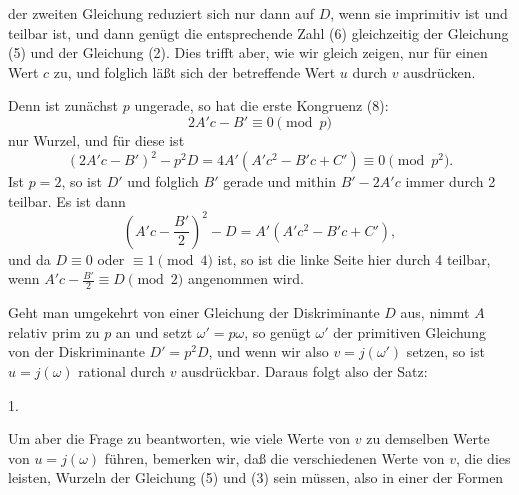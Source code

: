 der zweiten Gleichung reduziert sich nur dann auf $D$, wenn sie imprimitiv ist und
teilbar ist, und dann genügt die entsprechende Zahl (6) gleichzeitig der Gleichung (5) und der Gleichung (2). Dies trifft aber, wie wir gleich zeigen, nur für einen Wert $c$ zu, und folglich läßt sich der betreffende Wert $u$  durch $v$ ausdrücken.

Denn ist zunächst $p$ ungerade, so hat die erste Kongruenz (8):
\[
2A'c - B' \equiv 0 \pmod{p}
\]
nur  Wurzel, und für diese ist
\[
(2A'c - B')^2 - p^2D = 4A'(A'c^2 - B'c + C') \equiv 0 \pmod{p^2}.
\]
Ist $p = 2$, so ist $D'$ und folglich $B'$ gerade und mithin $B' - 2A'c$ immer durch 2 teilbar. Es ist dann
\[
\left(A'c - \frac{B'}{2}\right)^2 - D = A'(A'c^2 - B'c + C'),
\]
und da $D \equiv 0$ oder $\equiv 1 \pmod{4}$ ist, so ist die linke Seite hier durch 4 teilbar, wenn $A'c - \frac{B'}{2} \equiv D \pmod{2}$ angenommen wird.

Geht man umgekehrt von einer Gleichung
der Diskriminante $D$ aus, nimmt $A$ relativ prim zu $p$ an und setzt $\omega' = p\omega$, so genügt $\omega'$ der primitiven Gleichung
von der Diskriminante $D' = p^2D$, und wenn wir also $v = j(\omega')$
setzen, so ist $u = j(\omega)$ rational durch $v$ ausdrückbar. Daraus folgt also der Satz:

1. 

Um aber die Frage zu beantworten, wie viele Werte von $v$ zu demselben Werte von $u = j(\omega)$ führen, bemerken wir, daß die verschiedenen Werte von $v$, die dies leisten, Wurzeln der Gleichung (5) und (3) sein müssen, also in einer der Formen
